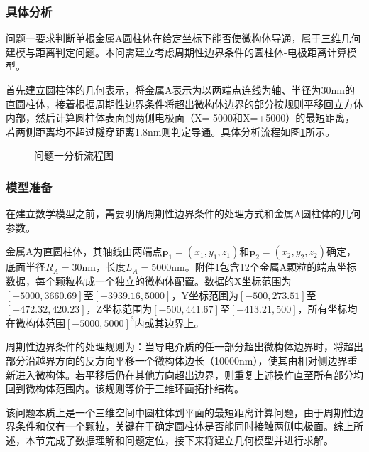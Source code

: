 
\subsubsection{具体分析}

问题一要求判断单根金属A圆柱体在给定坐标下能否使微构体导通，属于三维几何建模与距离判定问题。本问需建立考虑周期性边界条件的圆柱体-电极距离计算模型。

首先建立圆柱体的几何表示，将金属A表示为以两端点连线为轴、半径为30nm的直圆柱体，接着根据周期性边界条件将超出微构体边界的部分按规则平移回立方体内部，然后计算圆柱体表面到两侧电极面（X=-5000和X=+5000）的最短距离，若两侧距离均不超过隧穿距离1.8nm则判定导通。具体分析流程如图\ref{fig:analysis1_flow}所示。

\begin{figure}[ht]
  \begin{center}
    \caption{问题一分析流程图}
    \label{fig:analysis1_flow}
  \end{center}
\end{figure}

\subsubsection{模型准备}

在建立数学模型之前，需要明确周期性边界条件的处理方式和金属A圆柱体的几何参数。

金属A为直圆柱体，其轴线由两端点$\mathbf{p}_1=(x_1,y_1,z_1)$和$\mathbf{p}_2=(x_2,y_2,z_2)$确定，底面半径$R_A=30$nm，长度$L_A=5000$nm。附件1包含12个金属A颗粒的端点坐标数据，每个颗粒构成一个独立的微构体配置。数据的X坐标范围为$[-5000, 3660.69]$至$[-3939.16, 5000]$，Y坐标范围为$[-500, 273.51]$至$[-472.32, 420.23]$，Z坐标范围为$[-500, 441.67]$至$[-413.21, 500]$，所有坐标均在微构体范围$[-5000, 5000]^3$内或其边界上。

周期性边界条件的处理规则为：当导电介质的任一部分超出微构体边界时，将超出部分沿越界方向的反方向平移一个微构体边长（10000nm），使其由相对侧边界重新进入微构体。若平移后仍在其他方向超出边界，则重复上述操作直至所有部分均回到微构体范围内。该规则等价于三维环面拓扑结构。

该问题本质上是一个三维空间中圆柱体到平面的最短距离计算问题，由于周期性边界条件和仅有一个颗粒，关键在于确定圆柱体是否能同时接触两侧电极面。综上所述，本节完成了数据理解和问题定位，接下来将建立几何模型并进行求解。
